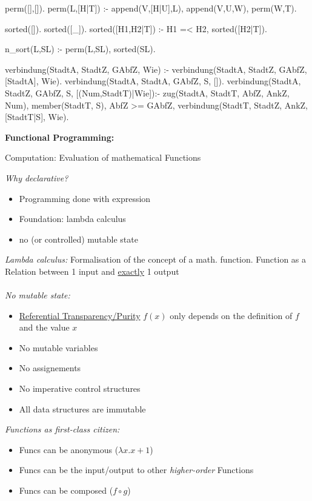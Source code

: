 \begin{breakbox}
\begin{prologcode}
perm([],[]).
perm(L,[H|T]) :- append(V,[H|U],L), append(V,U,W), perm(W,T).


sorted([]).
sorted([_]).
sorted([H1,H2|T]) :- H1 =< H2, sorted([H2|T]).


n_sort(L,SL) :- perm(L,SL), sorted(SL).


verbindung(StadtA, StadtZ, GAbfZ, Wie) :-
verbindung(StadtA, StadtZ, GAbfZ, [StadtA], Wie). %
verbindung(StadtA, StadtA, GAbfZ, S, []). %
verbindung(StadtA, StadtZ, GAbfZ, S, [(Num,StadtT)|Wie]):-
zug(StadtA, StadtT, AbfZ, AnkZ, Num),
\+ member(StadtT, S),
AbfZ >= GAbfZ,
verbindung(StadtT, StadtZ, AnkZ, [StadtT|S], Wie).
\end{prologcode}
\end{breakbox}

\begin{breakbox}
\textbf{Functional Programming:}
\begin{mdframed}
  \begin{center}
  	Computation: Evaluation of mathematical Functions
  \end{center}
\end{mdframed}
\emph{Why declarative?}
\begin{itemize}
	\item Programming done with expression
	\item Foundation: lambda calculus
	\item no (or controlled) mutable state
\end{itemize}
\emph{Lambda calculus:} Formalisation of the concept of a math. function. Function as a Relation between 1 input and \underline{exactly} 1 output \\\\
\emph{No mutable state:}
\begin{itemize}
	\item \underline{Referential Transparency/Purity} $f(x)$ only depends on the definition of $f$ and the value $x$
	\item No mutable variables
	\item No assignements
	\item No imperative control structures
	\item All data structures are immutable\\
\end{itemize}
\emph{Functions as first-class citizen:}
\begin{itemize}
	\item Funcs can be anonymous ($\lambda x.x+1$)
	\item Funcs can be the input/output to other \emph{higher-order} Functions
	\item Funcs can be composed ($f \circ g$)
\end{itemize}
\end{breakbox}

